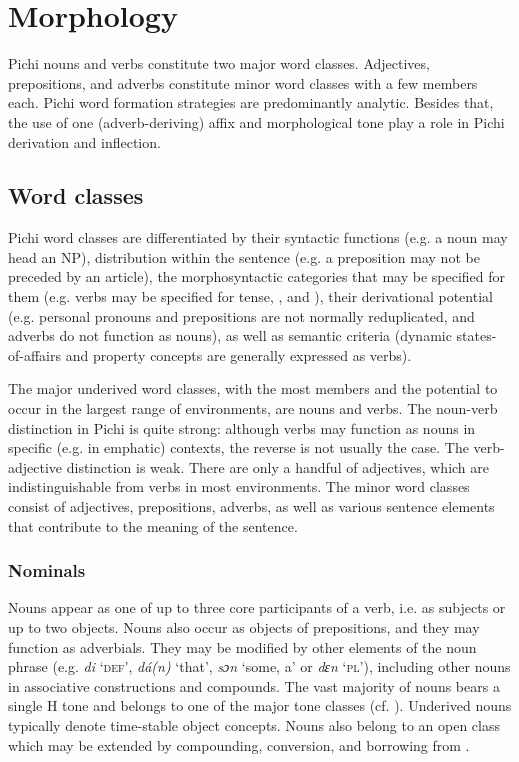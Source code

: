 \chapter{Morphology}

Pichi nouns and verbs constitute two major word classes. Adjectives, prepositions, and adverbs constitute minor word classes with a few members each. Pichi word formation strategies are predominantly analytic. Besides that, the use of one (adverb-deriving) affix and morphological tone play a role in Pichi derivation and inflection.

\section{Word classes}\label{sec:4.1}

Pichi word classes are differentiated by their syntactic functions (e.g. a noun may head an \textsc{NP}), distribution within the sentence (e.g. a preposition may not be preceded by an article), the morphosyntactic categories that may be specified for them (e.g. verbs may be specified for tense, , and ), their derivational potential (e.g. personal pronouns and prepositions are not normally reduplicated, and adverbs do not function as nouns), as well as semantic criteria (dynamic states-of-affairs and property concepts are generally expressed as verbs). 


The major underived word classes, with the most members and the potential to occur in the largest range of environments, are nouns and verbs. The noun-verb distinction in Pichi is quite strong: although verbs may function as nouns in specific (e.g. in emphatic) contexts, the reverse is not usually the case. The verb-adjective distinction is weak. There are only a handful of adjectives, which are indistinguishable from verbs in most environments. The minor word classes consist of adjectives, prepositions, adverbs, as well as various sentence elements that contribute to the meaning of the sentence. 


\subsection{Nominals}

Nouns appear as one of up to three core participants of a verb, i.e. as subjects or up to two objects. Nouns also occur as objects of prepositions, and they may function as adverbials. They may be modified by other elements of the noun phrase (e.g. \textit{di} ‘\textsc{def}’, \textit{dá(n)} ‘that’, \textit{sɔn} ‘some, a’ or \textit{dɛn} ‘\textsc{pl’)}, including other nouns in associative constructions and compounds. The vast majority of nouns bears a single H tone and belongs to one of the major tone classes (cf. ). Underived nouns typically denote time-stable object concepts. Nouns also belong to an open class which may be extended by compounding, conversion, and borrowing from .


